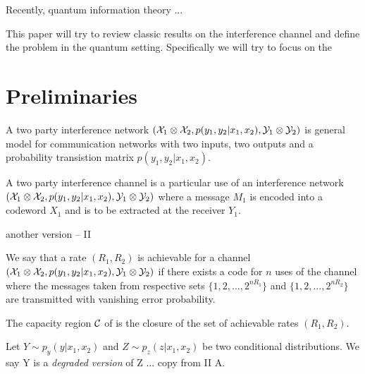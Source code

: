 \documentclass[aps,11pt,twoside,letterpaper]{article}
\theoremstyle{plain}
\theoremstyle{definition}
\begin{document}
    Recently, quantum information theory ...
    
    This paper will try to review classic results on the interference channel and
    define the problem in the quantum setting.
    Specifically we will try to focus on the 
    
    
    
    
 \section{Preliminaries}

	
        \begin{definition}
            A two party interference network $({\cal X}_1 \otimes {\cal X}_2, p(y_1,y_2|x_1,x_2), {\cal Y}_1 \otimes {\cal Y}_2)$ 
            is general model for communication networks with two inputs, two outputs and a probability transistion
            matrix $p(y_1,y_2|x_1,x_2)$.
        \end{definition}
        
        

        \begin{definition}
            A two party interference channel is a particular use of an interference network 
            $({\cal X}_1 \otimes {\cal X}_2, p(y_1,y_2|x_1,x_2), {\cal Y}_1 \otimes {\cal Y}_2)$ 
            where a message $M_1$ is encoded into a codeword $X_1$ and is to be extracted at the receiver $Y_1$.
        \end{definition}

        another version -- II

        
        \begin{definition}
            We say that a rate $(R_1,R_2)$ is achievable for a channel $({\cal X}_1 \otimes {\cal X}_2, p(y_1,y_2|x_1,x_2), {\cal Y}_1 \otimes {\cal Y}_2)$
            if there exists a code for $n$ uses of the channel where the messages taken from respective sets $\{1,2,\ldots,2^{nR_1} \}$ and
             $\{1,2,\ldots,2^{nR_2} \}$ are transmitted with vanishing error probability.
        \end{definition}
        
        
        \begin{definition}[Capacity]
            The capacity region ${\cal C}$ of is the closure of the set of achievable rates $(R_1,R_2)$.
        \end{definition}


        \begin{definition}
            Let $Y \sim p_y(y|x_1,x_2)$ and $Z \sim p_z(z|x_1,x_2)$ be two conditional distributions.
            We say Y is a \emph{degraded version} of Z ...
            copy from \cite{Carleial83} II A.
        \end{definition}
\end{document}
